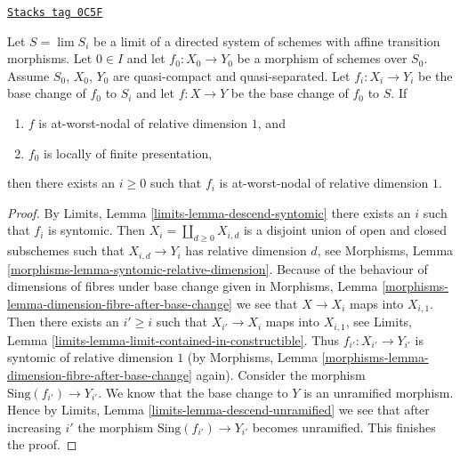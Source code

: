 \begin{lemma}
\label{curves-lemma-descend-nodal-family}
\href{https://stacks.math.columbia.edu/tag/0C5F}{\texttt{Stacks tag 0C5F}}

Let $S = \lim S_i$ be a limit of a directed system of schemes
with affine transition morphisms.
Let $0 \in I$ and let $f_0 : X_0 \to Y_0$ be a morphism of schemes over $S_0$.
Assume $S_0$, $X_0$, $Y_0$ are quasi-compact and quasi-separated.
Let $f_i : X_i \to Y_i$ be the base change of $f_0$ to $S_i$ and
let $f : X \to Y$ be the base change of $f_0$ to $S$.
If
\begin{enumerate}
\item $f$ is at-worst-nodal of relative dimension $1$, and
\item $f_0$ is locally of finite presentation,
\end{enumerate}
then there exists an $i \geq 0$ such that $f_i$ is at-worst-nodal
of relative dimension $1$.
\end{lemma}

\begin{proof}
By Limits, Lemma \ref{limits-lemma-descend-syntomic}
there exists an $i$ such that $f_i$ is syntomic.
Then $X_i = \coprod_{d \geq 0} X_{i, d}$ is a disjoint union of
open and closed subschemes such that $X_{i, d} \to Y_i$
has relative dimension $d$, see
Morphisms, Lemma \ref{morphisms-lemma-syntomic-relative-dimension}.
Because of the behaviour of dimensions of fibres under base change given in
Morphisms, Lemma \ref{morphisms-lemma-dimension-fibre-after-base-change}
we see that $X \to X_i$ maps into $X_{i, 1}$.
Then there exists an $i' \geq i$ such that $X_{i'} \to X_i$
maps into $X_{i, 1}$, see
Limits, Lemma \ref{limits-lemma-limit-contained-in-constructible}.
Thus $f_{i'} : X_{i'} \to Y_{i'}$ is syntomic of relative dimension $1$
(by Morphisms, Lemma \ref{morphisms-lemma-dimension-fibre-after-base-change}
again).
Consider the morphism $\text{Sing}(f_{i'}) \to Y_{i'}$.
We know that the base change to $Y$ is an unramified morphism.
Hence by Limits, Lemma \ref{limits-lemma-descend-unramified}
we see that after increasing $i'$ the morphism
$\text{Sing}(f_{i'}) \to Y_{i'}$ becomes unramified.
This finishes the proof.
\end{proof}

